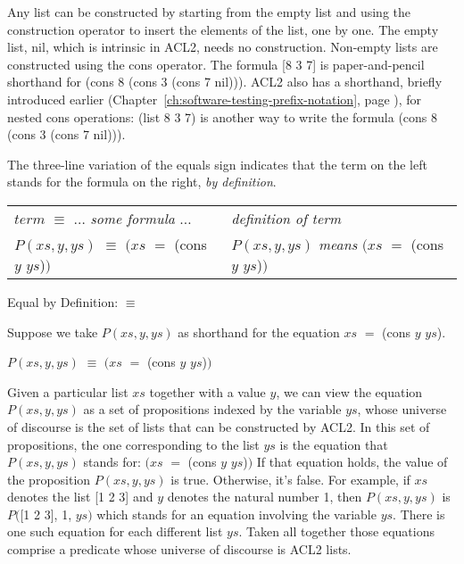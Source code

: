 Any list can be constructed by starting from the empty list
and using the construction operator to insert the elements of the list, one by one.
The empty list, \textsf{nil}, which is intrinsic in ACL2, needs no construction.
Non-empty lists are constructed using the \textsf{cons} operator.
The formula \textsf{[8 3 7]} is paper-and-pencil shorthand
for \textsf{(cons 8 (cons 3 (cons 7 nil)))}.
ACL2 also has a shorthand, briefly introduced earlier
(Chapter~\ref{ch:software-testing-prefix-notation}, page \pageref{list-op-informal}),
for nested \textsf{cons} operations: \textsf{(list 8 3 7)} is another way to write the formula
\textsf{(cons 8 (cons 3 (cons 7 nil)))}.

\begin{aside}
The
three-line
variation of the equals sign
indicates that the term on the left stands
for the formula on the right, \emph{by definition}.
\begin{center}
\addtolength{\tabcolsep}{-2pt}
\begin{tabular}{ll}
$term$ $\equiv$ $\dots$ \emph{some formula} $\dots$    &\emph{definition of term} \\
$P(xs, y, ys)$ $\equiv$ $(xs$ $=$ \textsf{(cons $y$ $ys$)}$)$ &$P(xs, y, ys)$ \emph{means} $(xs$ $=$ \textsf{(cons $y$ $ys$)}$)$  \\
\end{tabular}
\addtolength{\tabcolsep}{2pt}
\end{center}
\caption{Equal by Definition: $\equiv$}
\label{three-line-equal}
\end{aside}

Suppose we take $P(xs, y, ys)$ as shorthand
for the equation $xs$ $=$ \textsf{(cons $y$ $ys$)}.
\begin{center}
$P(xs, y, ys)$ $\equiv$ $(xs$ $=$ \textsf{(cons $y$ $ys$)}$)$
\end{center}

Given a particular list $xs$ together with a value $y$,
we can view the equation $P(xs, y, ys)$ as a set of propositions
indexed by the variable $ys$, whose universe of discourse is the set of
lists that can be constructed by ACL2.
In this set of propositions, the one corresponding to
the list $ys$ is the equation that $P(xs, y, ys)$ stands for:
$(xs$ $=$ \textsf{(cons $y$ $ys$)}$)$
If that equation holds, the value of the proposition $P(xs, y, ys)$ is true.
Otherwise, it's false.
For example, if $xs$ denotes the list \textsf{[1 2 3]}
and $y$ denotes the natural number 1,
then $P(xs, y, ys)$ is $P($\textsf{[1 2 3]}, \textsf{1}, $ys)$
which stands for an equation involving the variable $ys$.
There is one such equation for each different list $ys$.
Taken all together those equations comprise a predicate
whose universe of discourse is ACL2 lists.

